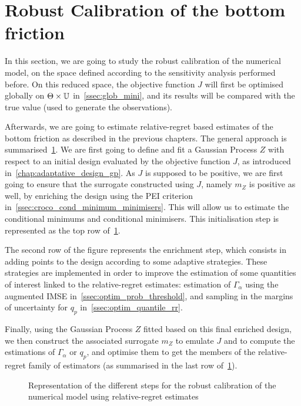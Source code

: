 \documentclass[../../Main_ManuscritThese.tex]{subfiles}
\newcommand\imgpath{/home/victor/acadwriting/Manuscrit/Text/Chapter5/img/}
\begin{document}
\section{Robust Calibration of the bottom friction}
\label{sec:robust_calibration}
In this section, we are going to study the robust calibration of the
numerical model, on the space defined according to the sensitivity
analysis performed before. On this reduced space, the objective
function $J$ will first be optimised globally on
$\Theta \times \mathbb{U}$ in~\cref{ssec:glob_mini}, and its results
will be compared with the true value (used to generate the
observations).

Afterwards, we are going to estimate relative-regret based estimates
of the bottom friction as described in the previous chapters. The
general approach is summarised~\cref{fig:diagram_recap}.  We are first
going to define and fit a Gaussian Process $Z$ with respect to an
initial design evaluated by the objective function $J$,
as introduced in~\cref{chap:adaptative_design_gp}.  As $J$ is supposed to
be positive, we are first going to ensure that the surrogate
constructed using $J$, namely $m_Z$ is positive as well, by enriching
the design using the PEI
criterion in~\cref{ssec:croco_cond_minimum_minimisers}. This will allow
us to estimate the conditional minimums and conditional minimisers.
This initialisation step is represented as the top row
of~\cref{fig:diagram_recap}.

The second row of the figure represents the enrichment step, which
consists in adding points to the design according to some adaptive
strategies. These strategies are implemented in order to improve the
estimation of some quantities of interest linked to the
relative-regret estimates: estimation of $\Gamma_{\alpha}$ using the
augmented IMSE in~\cref{ssec:optim_prob_threshold}, and sampling in
the margins of uncertainty for $q_p$ in~\cref{ssec:optim_quantile_rr}.

Finally, using the Gaussian Process $Z$ fitted based on this final
enriched design, we then construct the associated surrogate $m_Z$ to
emulate $J$ and to compute the estimations of $\Gamma_{\alpha}$ or
$q_p$, and optimise them to get the members of the relative-regret
family of estimators (as summarised in the last row
of~\cref{fig:diagram_recap}).



\begin{figure}[ht]
  \centering
  
  \caption{\label{fig:diagram_recap} Representation of the different
    steps for the robust calibration of the numerical model using
    relative-regret estimates}
\end{figure}
\end{document}
